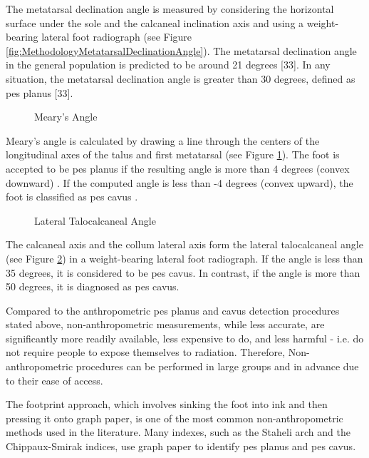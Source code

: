 The metatarsal declination angle is measured by considering the horizontal surface under the sole and the calcaneal inclination axis and using a weight-bearing lateral foot radiograph (see Figure \ref{fig:MethodologyMetatarsalDeclinationAngle}). The metatarsal declination angle in the general population is predicted to be around 21 degrees [33]. In any situation, the metatarsal declination angle is greater than 30 degrees, defined as pes planus [33].

\begin{figure}[htbp]
\centering
{}
\caption{Meary's Angle \cite{radiopaediamearysangle}}
\label{fig:MethodologyMearysAngle}
\end{figure}

Meary's angle \cite{deniz2014ccocuklardaki} is calculated by drawing a line through the centers of the longitudinal axes of the talus and first metatarsal (see Figure \ref{fig:MethodologyMearysAngle}). The foot is accepted to be pes planus if the resulting angle is more than 4 degrees (convex downward) \cite{vanderwilde1988measurements}. If the computed angle is less than -4 degrees (convex upward), the foot is classified as pes cavus \cite{banks2001mcglamry}.

\begin{figure}[htbp]
\centering
{}
\caption{Lateral Talocalcaneal Angle \cite{radiopaediamearysangle}}
\label{fig:MethodologyLateralTalocalcanealAngle}
\end{figure}

The calcaneal axis and the collum lateral axis form the lateral talocalcaneal angle (see Figure \ref{fig:MethodologyLateralTalocalcanealAngle}) in a weight-bearing lateral foot radiograph.  If the angle is less than 35 degrees, it is considered to be pes cavus.  In contrast, if the angle is more than 50 degrees, it is diagnosed as pes cavus.

Compared to the anthropometric pes planus and cavus detection procedures stated above, non-anthropometric measurements, while less accurate, are significantly more readily available, less expensive to do, and less harmful - i.e. do not require people to expose themselves to radiation. Therefore, Non-anthropometric procedures can be performed in large groups and in advance due to their ease of access.

The footprint approach, which involves sinking the foot into ink and then pressing it onto graph paper, is one of the most common non-anthropometric methods used in the literature. Many indexes, such as the Staheli arch and the Chippaux-Smirak indices, use graph paper to identify pes planus and pes cavus.

